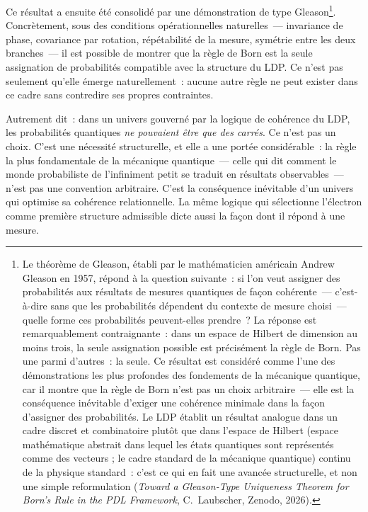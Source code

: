 \documentclass[12pt, a4paper, openright]{book}
\begin{document}
\medskip

Ce résultat a ensuite été consolidé par une démonstration de type Gleason\footnote{Le théorème de Gleason, établi par le mathématicien américain Andrew Gleason en 1957, répond à la question suivante~: si l'on veut assigner des probabilités aux résultats de mesures quantiques de façon cohérente~--- c'est-à-dire sans que les probabilités dépendent du contexte de mesure choisi~--- quelle forme ces probabilités peuvent-elles prendre~? La réponse est remarquablement contraignante~: dans un espace de Hilbert de dimension au moins trois, la seule assignation possible est précisément la règle de Born. Pas une parmi d'autres~: la seule. Ce résultat est considéré comme l'une des démonstrations les plus profondes des fondements de la mécanique quantique, car il montre que la règle de Born n'est pas un choix arbitraire~--- elle est la conséquence inévitable d'exiger une cohérence minimale dans la façon d'assigner des probabilités. Le LDP établit un résultat analogue dans un cadre discret et combinatoire plutôt que dans l'espace de Hilbert (espace mathématique abstrait dans lequel les états quantiques sont représentés comme des vecteurs ; le cadre standard de la mécanique quantique) continu de la physique standard~: c'est ce qui en fait une avancée structurelle, et non une simple reformulation (\textit{Toward a Gleason-Type Uniqueness Theorem for Born's Rule in the PDL Framework}, C.~Laubscher, Zenodo, 2026).}. Concrètement, sous des conditions opérationnelles naturelles~--- invariance de phase, covariance par rotation, répétabilité de la mesure, symétrie entre les deux branches~--- il est possible de montrer que la règle de Born est la seule assignation de probabilités compatible avec la structure du LDP. Ce n'est pas seulement qu'elle émerge naturellement~: aucune autre règle ne peut exister dans ce cadre sans contredire ses propres contraintes.

\medskip

Autrement dit~: dans un univers gouverné par la logique de cohérence du LDP, les probabilités quantiques \emph{ne pouvaient être que des carrés}. Ce n'est pas un choix. C'est une nécessité structurelle, et elle a une portée considérable~: la règle la plus fondamentale de la mécanique quantique~--- celle qui dit comment le monde probabiliste de l'infiniment petit se traduit en résultats observables~--- n'est pas une convention arbitraire. C'est la conséquence inévitable d'un univers qui optimise sa cohérence relationnelle. La même logique qui sélectionne l'électron comme première structure admissible dicte aussi la façon dont il répond à une mesure.
\end{document}
